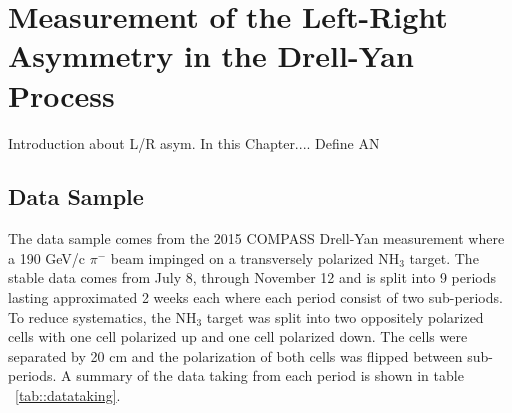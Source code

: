 \chapter{Measurement of the Left-Right Asymmetry in the Drell-Yan Process} 
\label{Chap::leftright}
\ifpdf
\graphicspath{{Chapters/LeftRight/Figs/Raster/}{Chapters/LeftRight/Figs/PDF/}{Chapters/LeftRight/Figs/}}
\else \graphicspath{{Chapters/LeftRight/Figs/Vector/}{Chapters/LeftRight/Figs/}} \fi

Introduction about L/R asym.  In this Chapter....  Define AN


\section{Data Sample}
The data sample comes from the 2015 COMPASS Drell-Yan measurement where a 190
GeV/c $\pi^-$ beam impinged on a transversely polarized NH$_3$ target.  The
stable data comes from July 8, through November 12 and is split into 9 periods
lasting approximated 2 weeks each where each period consist of two sub-periods.
To reduce systematics, the NH$_3$ target was split into two oppositely polarized
cells with one cell polarized up and one cell polarized down.  The cells were
separated by 20 cm and the polarization of both cells was flipped between
sub-periods.  A summary of the data taking from each period is shown in table
~\ref{tab::datataking}.

